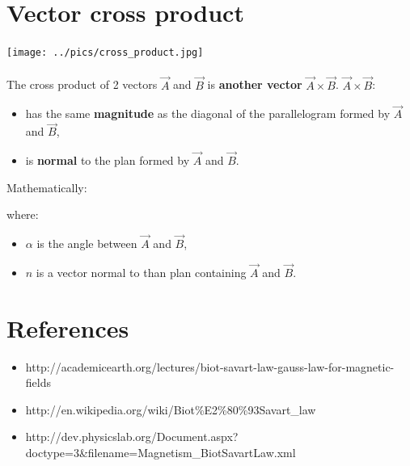\documentclass[12pt]{article}
\begin{document}
\newpage
\section{Vector cross product}
\begin{center}
  \texttt{[image: ../pics/cross\_product.jpg]}\\
\end{center}
\paragraph{} The cross product of 2 vectors $\vec{A}$ and $\vec{B}$ is \textbf{another vector}
$\vec{A} \times \vec{B}$. $\vec{A} \times \vec{B}$:
\begin{itemize}
  \item has the same \textbf{magnitude} as the diagonal of the parallelogram formed by $\vec{A}$
    and $\vec{B}$,
  \item is \textbf{normal} to the plan formed by $\vec{A}$ and $\vec{B}$.
\end{itemize}
Mathematically:
\begin{center}
\end{center}
where:
\begin{itemize}
\item $\alpha$ is the angle between $\vec{A}$ and $\vec{B}$,
\item $\hat{n}$ is a vector normal to than plan containing $\vec{A}$ and $\vec{B}$.
\end{itemize}

\newpage
\section{References}
\begin{itemize}
\item http://academicearth.org/lectures/biot-savart-law-gauss-law-for-magnetic-fields
\item http://en.wikipedia.org/wiki/Biot\%E2\%80\%93Savart\_law
\item http://dev.physicslab.org/Document.aspx?doctype=3\&filename=Magnetism\_BiotSavartLaw.xml
\end{itemize}
\end{document}
